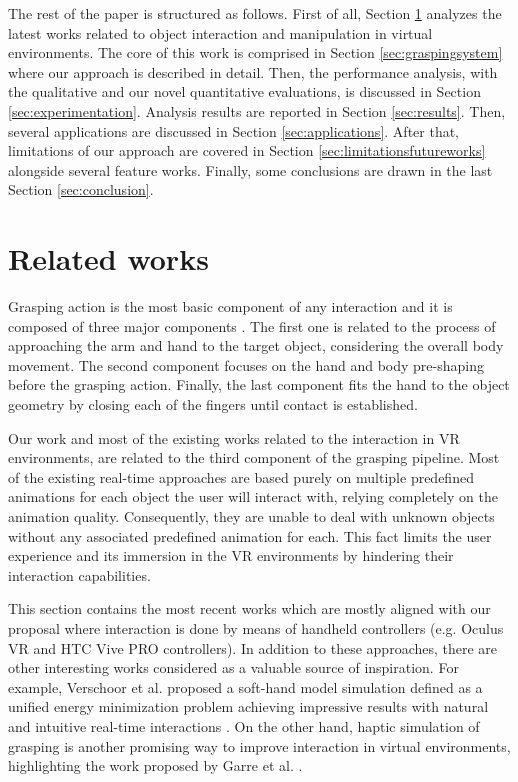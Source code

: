The rest of the paper is structured as follows. First of all, Section \ref{sec:related_works} analyzes the latest works related to object interaction and manipulation in virtual environments. The core of this work is comprised in Section \ref{sec:graspingsystem} where our approach is described in detail. Then, the performance analysis, with the qualitative and our novel quantitative evaluations, is discussed in Section \ref{sec:experimentation}. Analysis results are reported in Section \ref{sec:results}. Then, several applications are discussed in Section \ref{sec:applications}. After that, limitations of our approach are covered in Section \ref{sec:limitationsfutureworks} alongside several feature works. Finally, some conclusions are drawn in the last Section \ref{sec:conclusion}.

\section{Related works}
\label{sec:related_works}
Grasping action is the most basic component of any interaction and it is composed of three major components \cite{aydin1999}. The first one is related to the process of approaching the arm and hand to the target object, considering the overall body movement. The second component focuses on the hand and body pre-shaping before the grasping action. Finally, the last component fits the hand to the object geometry by closing each of the fingers until contact is established.

Our work and most of the existing works related to the interaction in VR environments, are related to the third component of the grasping pipeline. Most of the existing real-time approaches are based purely on multiple predefined animations for each object the user will interact with, relying completely on the animation quality. Consequently, they are unable to deal with unknown objects without any associated predefined animation for each. This fact limits the user experience and its immersion in the VR environments by hindering their interaction capabilities.

This section contains the most recent works which are mostly aligned with our proposal where interaction is done by means of handheld controllers (e.g. Oculus VR and HTC Vive PRO controllers). In addition to these approaches, there are other interesting works considered as a valuable source of inspiration. For example, Verschoor et al. proposed a soft-hand model simulation defined as a unified energy minimization problem achieving impressive results with natural and intuitive real-time interactions \cite{Verschoor2018}. On the other hand, haptic simulation of grasping is another promising way to improve interaction in virtual environments, highlighting the work proposed by Garre et al. \cite{Garre2011}.

